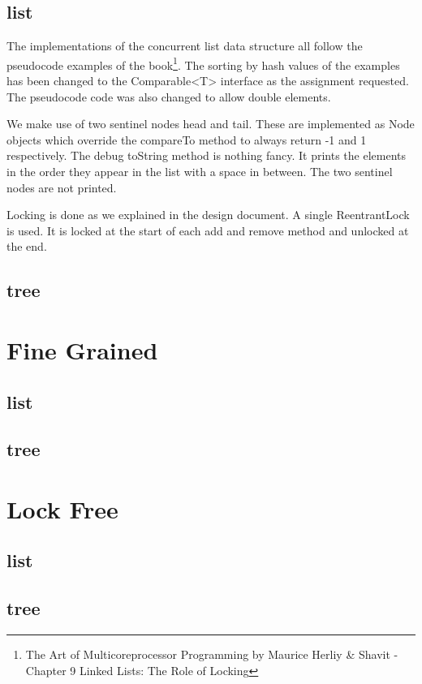 \documentclass[10pt,a4paper]{article}
\begin{document}
\subsection{list}
The implementations of the concurrent list data structure all follow the pseudocode examples of the book\footnote{The Art of Multicoreprocessor Programming by Maurice Herliy \& Shavit - Chapter 9 Linked Lists: The Role of Locking}. The sorting by hash values of the examples has been changed to the Comparable<T> interface as the assignment requested. The pseudocode code was also changed to allow double elements.

We make use of two sentinel nodes head and tail. These are implemented as Node objects which override the compareTo method to always return -1 and 1 respectively. The debug toString method is nothing fancy. It prints the elements in the order they appear in the list with a space in between. The two sentinel nodes are not printed.

Locking is done as we explained in the design document. A single ReentrantLock is used. It is locked at the start of each add and remove method and unlocked at the end. 


\subsection{tree}




\section{Fine Grained}
\subsection{list}
\subsection{tree}

\section{Lock Free}
\subsection{list}
\subsection{tree}
\end{document}
